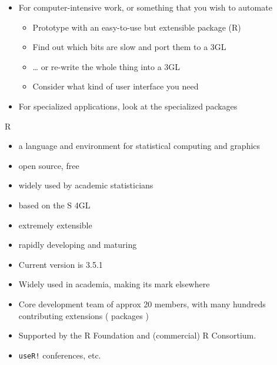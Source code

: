 \documentclass[ignorenonframetext,]{beamer}
\providecommand{\tightlist}{%
  \setlength{\itemsep}{0pt}\setlength{\parskip}{0pt}}
\begin{document}
\begin{frame}

\begin{itemize}[<+->]
\tightlist
\item
  For computer-intensive work, or something that you wish to automate

  \begin{itemize}[<+->]
  \tightlist
  \item
    Prototype with an easy-to-use but extensible package (R)
  \item
    Find out which bits are slow and port them to a 3GL
  \item
    \ldots{} or re-write the whole thing into a 3GL
  \item
    Consider what kind of user interface you need
  \end{itemize}
\item
  For specialized applications, look at the specialized packages
\end{itemize}

\end{frame}

\begin{frame}{R}

\begin{itemize}[<+->]
\tightlist
\item
  a language and environment for statistical computing and graphics
\item
  open source, free
\item
  widely used by academic statisticians
\item
  based on the S 4GL
\item
  extremely extensible
\item
  rapidly developing and maturing
\end{itemize}

\end{frame}

\begin{frame}[fragile]

\begin{itemize}[<+->]
\tightlist
\item
  Current version is 3.5.1
\item
  Widely used in academia, making its mark elsewhere
\item
  Core development team of approx 20 members, with many hundreds
  contributing extensions ( packages )
\item
  Supported by the R Foundation and (commercial) R Consortium.
\item
  \texttt{useR!} conferences, etc.
\end{itemize}

\end{frame}
\end{document}
